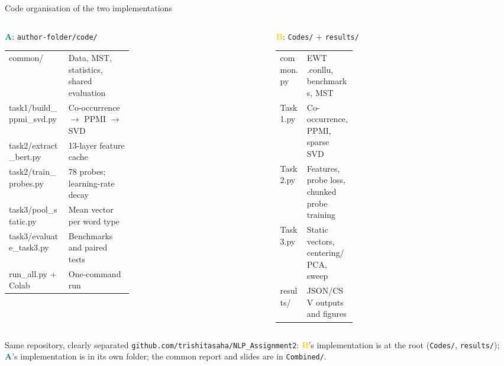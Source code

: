 \documentclass[aspectratio=169,9pt,t]{beamer}
\newcommand{\A}{\textcolor{Teal}{\bfseries A}}
\newcommand{\B}{\textcolor{Gold}{\bfseries B}}
\begin{document}
\begin{frame}{Code organisation of the two implementations}
\begin{columns}[T,onlytextwidth]
\begin{block}{\A: \texttt{author-folder/code/}}
\scriptsize
\begin{tabularx}{\linewidth}{@{}>{\ttfamily\raggedright\arraybackslash}p{0.48\linewidth}X@{}}
common/ & Data, MST, statistics, shared evaluation \\
task1/build\_ppmi\_svd.py & Co-occurrence $\to$ PPMI $\to$ SVD \\
task2/extract\_bert.py & 13-layer feature cache \\
task2/train\_probes.py & 78 probes; learning-rate decay \\
task3/pool\_static.py & Mean vector per word type \\
task3/evaluate\_task3.py & Benchmarks and paired tests \\
run\_all.py + Colab & One-command run \\
\end{tabularx}
\end{block}
\begin{block}{\B: \texttt{Codes/} + \texttt{results/}}
\scriptsize
\begin{tabularx}{\linewidth}{@{}>{\ttfamily\raggedright\arraybackslash}p{0.35\linewidth}X@{}}
common.py & EWT .conllu, benchmarks, MST \\
Task1.py & Co-occurrence, PPMI, sparse SVD \\
Task2.py & Features, probe loss, chunked probe training \\
Task3.py & Static vectors, centering/PCA, sweep \\
results/ & JSON/CSV outputs and figures \\
\end{tabularx}
\end{block}
\end{columns}
\vspace{0.35em}
\begin{exampleblock}{Same repository, clearly separated}
\small \texttt{github.com/trishitasaha/NLP\_Assignment2}: \B's implementation is at the root (\texttt{Codes/}, \texttt{results/}); \A's implementation is in its own folder; the common report and slides are in \texttt{Combined/}.
\end{exampleblock}
\vspace{0.3em}
\centering
\begin{tikzpicture}[node distance=0.36cm,>=Latex,every node/.style={font=\small,align=center}]

\end{tikzpicture}
\end{frame}
\end{document}

